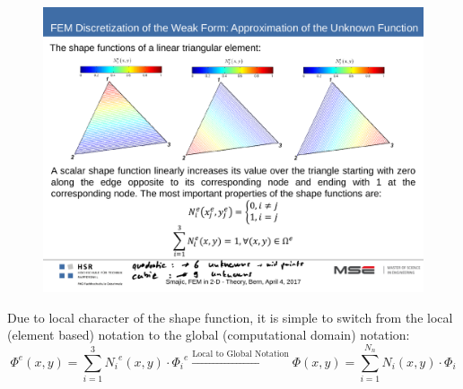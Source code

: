 \begin{figure}[h!]
	\includegraphics[width=.8\textwidth]{./images/shapeFunc.pdf}
\end{figure}

Due to local character of the shape function, it is simple to switch from the local (element based) notation to the global (computational domain) notation:
\begin{equation*}
	\Phi^e(x,y) = \sum_{i=1}^{3}{N_i}^e(x,y) \cdot {\Phi_i}^e \xrightarrow{\textrm{Local to Global Notation}} \Phi(x,y) = \sum_{i=1}^{N_n} N_i(x,y) \cdot \Phi_i
\end{equation*}

